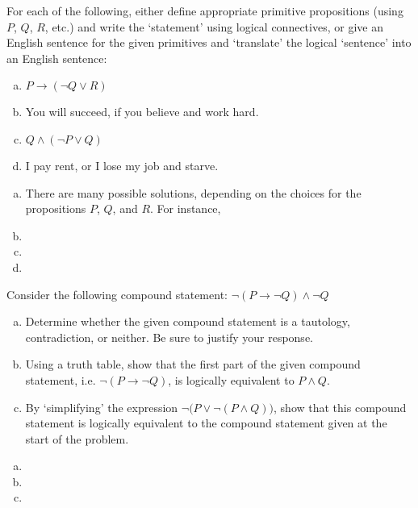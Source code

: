 \documentclass[11pt,letterpaper]{article}
\begin{document}
\newpage



 For each of the following, either define appropriate primitive propositions (using $P$, $Q$, $R$, etc.) and write the `statement' using logical connectives, or give an English sentence for the given primitives and `translate' the logical `sentence' into an English sentence:
	\begin{enumerate}[(a)]
	\item $P \to (\neg Q \vee R)$
	\item You will succeed, if you believe and work hard. 
	\item $Q \wedge (\neg P \vee Q)$
	\item I pay rent, or I lose my job and starve. 
	\end{enumerate} \pspace

\sol 
\begin{enumerate}[(a)]
\item There are many possible solutions, depending on the choices for the propositions $P$, $Q$, and $R$. For instance, 

\item 
\item 
\item 
\end{enumerate}



\newpage



 Consider the following compound statement: $\neg (P \to \neg Q) \wedge \neg Q$
	\begin{enumerate}[(a)]
	\item Determine whether the given compound statement is a tautology, contradiction, or neither. Be sure to justify your response. 
	\item Using a truth table, show that the first part of the given compound statement, i.e. $\neg (P \to \neg Q)$, is logically equivalent to $P \wedge Q$. 
	\item By `simplifying' the expression $\neg \big(P \vee \neg (P \wedge Q) \big)$, show that this compound statement is logically equivalent to the compound statement given at the start of the problem.
	\end{enumerate} \pspace

\sol 
\begin{enumerate}[(a)]
\item 
\item 
\item 
\end{enumerate}
\end{document}
